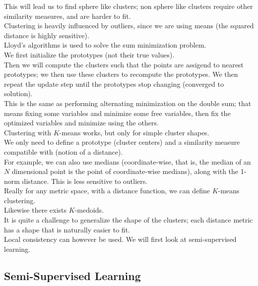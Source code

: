 \documentclass[12pt]{article}
\begin{document}
This will lead us to find sphere like clusters; non
sphere like clusters require other similarity measures,
and are harder to fit. \\

Clustering is heavily influenced by outliers, 
since we are using means (the squared distance
is highly sensitive). \\

Lloyd's algorithms is used to solve the
sum minimization problem. \\
We first initialize the prototypes (not their true values). \\
Then we will compute the clusters such that the points
are assigend to nearest prototypes; we then use
these clusters to recompute the prototypes.
We then repeat the update step until the prototypes
stop changing (converged to solution). \\

This is the same as performing alternating minimization
on the double sum; that means fixing some variables
and minimize some free variables, then fix the optimized
variables and minimize using the others. \\

Clustering with $K$-means works, but only for simple
cluster shapes. \\

We only need to define a prototype (cluster centers)
and a similarity measure compatible with (notion of
a distance). \\

For example, we can also use medians (coordinate-wise,
that is, the median of an $N$ dimensional point
is the point of coordinate-wise medians), along with 
the 1-norm distance. This is less sensitive to
outliers. \\

Really for any metric space, with a distance function,
we can define $K$-means clustering. \\
Likewise there exists $K$-medoids. \\

It is quite a challenge to generalize the shape
of the clusters; each distance metric has a shape
that is naturally easier to fit. \\

Local consistency can however be used.
We will first look at semi-supervised learning. \\

\newpage

\subsection*{Semi-Supervised Learning}
\end{document}
